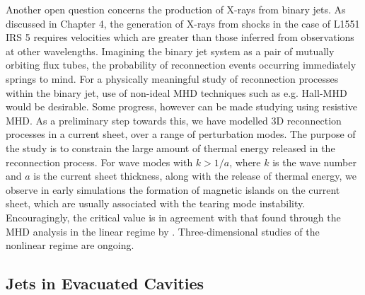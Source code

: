 Another open question concerns the production of X-rays from binary jets.  As
discussed in Chapter 4, the generation of X-rays from shocks in the case of
L1551 IRS 5 requires velocities which are greater than those inferred
from observations at other wavelengths.  Imagining the binary jet system as a
pair of mutually orbiting flux tubes, the probability of reconnection events
occurring immediately springs to mind.  For a physically meaningful study of
reconnection processes within the binary jet, use of non-ideal MHD techniques such
as e.g. Hall-MHD would be desirable.  Some progress, however can be made
studying using resistive MHD.  As a preliminary step towards this, we have
modelled 3D reconnection processes in a current sheet, over a range of
perturbation modes.  The purpose of the study is to constrain the large amount
of thermal energy released in the reconnection process.  
For wave modes with $k> 1/a$, where $k$ is the wave number and $a$ is the current sheet thickness, along
with the release of thermal energy, we
observe in early simulations the formation of magnetic islands on the current sheet, which are
usually associated with the tearing mode instability. Encouragingly, the
critical value is in agreement with that found through the MHD analysis in the linear regime by \citet{furth2004fri}.
Three-dimensional studies of the nonlinear regime are ongoing.



\subsection{Jets in Evacuated Cavities}

